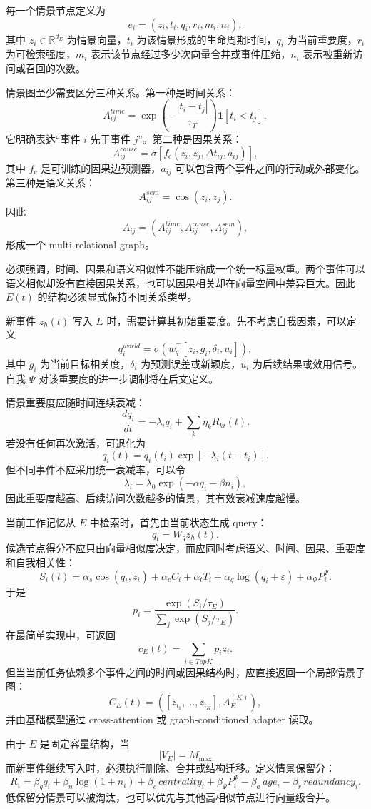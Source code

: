 每一个情景节点定义为
\[
e_i
=
\left(
z_i,
t_i,
q_i,
r_i,
m_i,
n_i
\right),
\]
其中 $z_i\in\mathbb{R}^{d_E}$ 为情景向量，$t_i$ 为该情景形成的生命周期时间，$q_i$ 为当前重要度，$r_i$ 为可检索强度，$m_i$ 表示该节点经过多少次向量合并或事件压缩，$n_i$ 表示被重新访问或召回的次数。

情景图至少需要区分三种关系。第一种是时间关系：
\[
A_{ij}^{time}
=
\exp
\left(
-\frac{|t_i-t_j|}{\tau_T}
\right)
\mathbf{1}[t_i<t_j],
\]
它明确表达“事件 $i$ 先于事件 $j$”。第二种是因果关系：
\[
A_{ij}^{cause}
=
\sigma
\left[
f_c
\left(
z_i,z_j,\Delta t_{ij},a_{ij}
\right)
\right],
\]
其中 $f_c$ 是可训练的因果边预测器，$a_{ij}$ 可以包含两个事件之间的行动或外部变化。第三种是语义关系：
\[
A_{ij}^{sem}
=
\cos
\left(
z_i,z_j
\right).
\]
因此
\[
A_{ij}
=
\left(
A_{ij}^{time},
A_{ij}^{cause},
A_{ij}^{sem}
\right),
\]
形成一个 multi-relational graph。

必须强调，时间、因果和语义相似性不能压缩成一个统一标量权重。两个事件可以语义相似却没有直接因果关系，也可以因果相关却在向量空间中差异巨大。因此 $E(t)$ 的结构必须显式保持不同关系类型。

新事件 $z_h(t)$ 写入 $E$ 时，需要计算其初始重要度。先不考虑自我因素，可以定义
\[
q_i^{world}
=
\sigma
\left(
w_q^\top
\left[
z_i,g_i,\delta_i,u_i
\right]
\right),
\]
其中 $g_i$ 为当前目标相关度，$\delta_i$ 为预测误差或新颖度，$u_i$ 为后续结果或效用信号。自我 $\Psi$ 对该重要度的进一步调制将在后文定义。

情景重要度应随时间连续衰减：
\[
\frac{dq_i}{dt}
=
-\lambda_i q_i
+
\sum_k\eta_kR_{ki}(t).
\]
若没有任何再次激活，可退化为
\[
q_i(t)
=
q_i(t_i)
\exp
\left[
-\lambda_i(t-t_i)
\right].
\]
但不同事件不应采用统一衰减率，可以令
\[
\lambda_i
=
\lambda_0
\exp
\left(
-\alpha q_i-\beta n_i
\right),
\]
因此重要度越高、后续访问次数越多的情景，其有效衰减速度越慢。

当前工作记忆从 $E$ 中检索时，首先由当前状态生成 query：
\[
q_t
=
W_qz_h(t).
\]
候选节点得分不应只由向量相似度决定，而应同时考虑语义、时间、因果、重要度和自我相关性：
\[
S_i(t)
=
\alpha_s
\cos(q_t,z_i)
+
\alpha_c C_i
+
\alpha_tT_i
+
\alpha_q\log(q_i+\varepsilon)
+
\alpha_\Psi P_i^\Psi.
\]
于是
\[
p_i
=
\frac{
\exp\left(S_i/\tau_E\right)
}{
\sum_j
\exp\left(S_j/\tau_E\right)
}.
\]
在最简单实现中，可返回
\[
c_E(t)
=
\sum_{i\in TopK}
p_i z_i.
\]
但当当前任务依赖多个事件之间的时间或因果结构时，应直接返回一个局部情景子图：
\[
C_E(t)
=
\left(
[z_{i_1},\ldots,z_{i_K}],
A_E^{(K)}
\right),
\]
并由基础模型通过 cross-attention 或 graph-conditioned adapter 读取。

由于 $E$ 是固定容量结构，当
\[
|V_E|=M_{\max}
\]
而新事件继续写入时，必须执行删除、合并或结构迁移。定义情景保留分：
\[
R_i
=
\beta_q q_i
+
\beta_n\log(1+n_i)
+
\beta_c\,centrality_i
+
\beta_\Psi P_i^\Psi
-
\beta_a\,age_i
-
\beta_r\,redundancy_i.
\]
低保留分情景可以被淘汰，也可以优先与其他高相似节点进行向量级合并。

